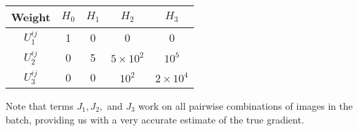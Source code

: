 \documentclass{article}
\renewenvironment{table}{\par\medskip\noindent\minipage{\linewidth}}{\endminipage\par\medskip}
\begin{document}
\begin{multicols}{2}

\begin{table}
\begin{small}\begin{sc}\begin{center}
\begin{tabular}{ccccc}
\hline
Weight & $H_0$ & $H_1$ & $H_2$ & $H_3$  \\ \hline
$U_1^{ij}$ & 1 & 0 & 0 & 0 \\
$U_2^{ij}$ & 0 & 5 & $5\times10^2$ & $10^5$ \\
$U_3^{ij}$ & 0 & 0 & $10^2$ & $2\times10^4$ \\ \hline
\end{tabular}
\end{center}\end{sc}\end{small}
\label{u_mats}
\end{table}

Note that terms $J_1, J_2,$ and $J_3$ work on all pairwise combinations of images in the batch, providing us with a very accurate estimate of the true gradient.



\end{multicols}
\end{document}
